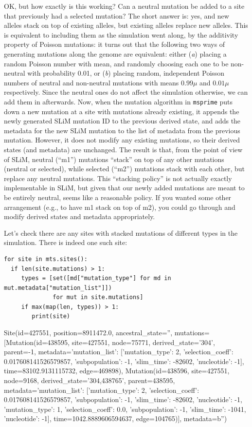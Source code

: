 \documentclass[12pt]{article}
\newcommand{\msprime}[0]{\texttt{msprime}\xspace}
\begin{document}
OK, but how exactly is this working?
Can a neutral mutation be added to a site that previously had a selected mutation?
The short answer is: yes, and new alleles stack on top of existing alleles,
but existing alleles replace new alleles.
This is equivalent to including them as the simulation went along,
by the additivity property of Poisson mutations:
it turns out that the following two ways of generating mutations along the genome are equivalent:
either (\textit{a}) placing a random Poisson number with mean,
and randomly choosing each one to be non-neutral with probability 0.01, or
(\textit{b}) placing random, independent Poisson numbers of neutral and non-neutral mutations with means $0.99 \mu$ and $0.01 \mu$ respectively.
Since the neutral ones do not affect the simulation otherwise, we can add them in afterwards.
Now, when the mutation algorithm in \msprime puts down a new mutation at a site with mutations already existing,
it appends the newly generated SLiM mutation ID to the previous derived state,
and adds the metadata for the new SLiM mutation to the list of metadata from the previous mutation.
However, it does not modify any existing mutations, so their derived states (and metadata) are unchanged.
The result is that, from the point of view of SLiM, neutral (“m1”) mutations “stack” on top of any other mutations (neutral or selected), while selected (“m2”) mutations stack with each other, but replace any neutral mutations.
This “stacking policy” is not actually exactly implementable in SLiM,
but given that our newly added mutations are meant to be entirely neutral,
seems like a reasonable policy.
If you wanted some other arrangement (e.g., to have m1 stack on top of m2),
you could go through and modify derived states and metadata appropriately.

Let’s check there are any sites with stacked mutations of different types in the simulation. There is indeed one such site:

\begin{listing}[H]
    \begin{verbatim}
for site in mts.sites():
  if len(site.mutations) > 1:
     types = [set([md["mutation_type"] for md in mut.metadata["mutation_list"]])
              for mut in site.mutations]
     if max(map(len, types)) > 1:
        print(site)
    \end{verbatim}
\end{listing}
\begin{pycon}
Site(id=427551, position=8911472.0, ancestral_state='', mutations=[Mutation(id=438595, site=427551, node=75771, derived_state='304', parent=-1, metadata={'mutation_list': [{'mutation_type': 2, 'selection_coeff': 0.017608141526579857, 'subpopulation': -1, 'slim_time': -82602, 'nucleotide': -1}]}, time=83102.9131115732, edge=469898), Mutation(id=438596, site=427551, node=9168, derived_state='304,438765', parent=438595, metadata={'mutation_list': [{'mutation_type': 2, 'selection_coeff': 0.017608141526579857, 'subpopulation': -1, 'slim_time': -82602, 'nucleotide': -1}, {'mutation_type': 1, 'selection_coeff': 0.0, 'subpopulation': -1, 'slim_time': -1041, 'nucleotide': -1}]}, time=1042.8889606594637, edge=104765)], metadata=b'')
\end{pycon}
\end{document}

